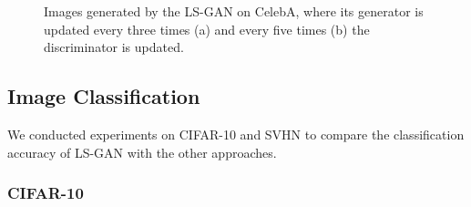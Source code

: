 \documentclass[11pt,fullpage, letterpaper,twoside]{article}
\newcommand{\1}[1]{\mathds{1}_{\left[#1\right]}}
\begin{document}
\begin{figure}[t]
\centering
{}
\caption{Images generated by the LS-GAN on CelebA, where its generator is updated every three times (a) and every five times (b) the discriminator is updated.}\label{fig:freq_gen}
\end{figure}



\subsection{Image Classification}
We conducted experiments on CIFAR-10 and SVHN to compare the classification accuracy of LS-GAN with the other approaches.



\subsubsection{CIFAR-10}
\end{document}
